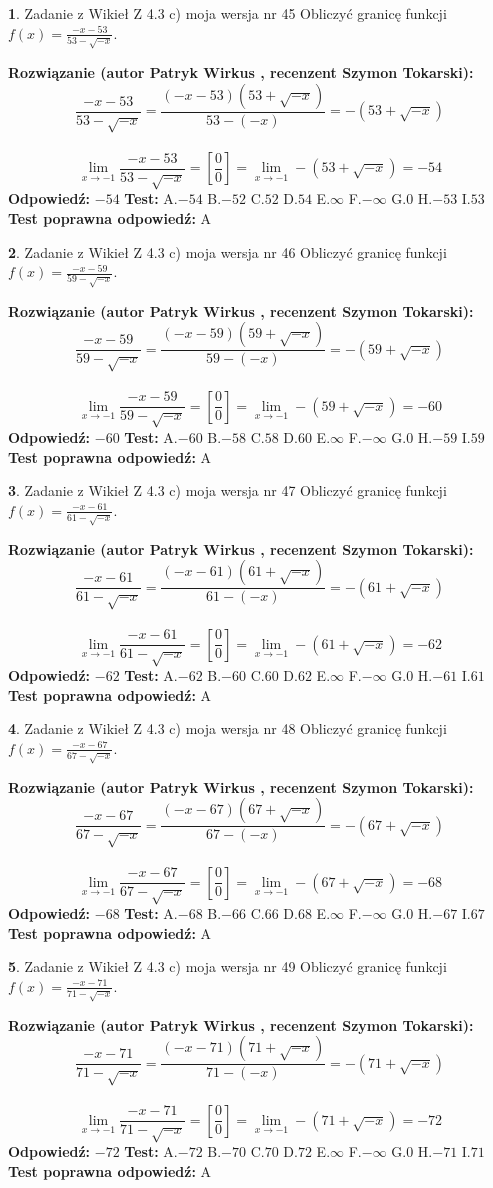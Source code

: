 \documentclass[12pt, a4paper]{article}
\theoremstyle{definition} %
\newtheorem{zad}{}
\newcommand{\zadStart}[1]{\begin{zad}#1\newline}
\newcommand{\zadStop}{\end{zad}}
\newcommand{\rozwStart}[2]{\noindent \textbf{Rozwiązanie (autor #1 , recenzent #2): }\newline}
\newcommand{\rozwStop}{\newline}
\newcommand{\odpStart}{\noindent \textbf{Odpowiedź:}\newline}
\newcommand{\odpStop}{\newline}
\newcommand{\testStart}{\noindent \textbf{Test:}\newline}
\newcommand{\testStop}{\newline}
\newcommand{\kluczStart}{\noindent \textbf{Test poprawna odpowiedź:}\newline}
\newcommand{\kluczStop}{\newline}
\begin{document}
\zadStart{Zadanie z Wikieł Z 4.3 c) moja wersja nr 45}
Obliczyć granicę funkcji $f(x)=\frac{-x-53}{53-\sqrt{-x}}$.
\zadStop
\rozwStart{Patryk Wirkus}{Szymon Tokarski}
$$\frac{-x-53}{53-\sqrt{-x}}=\frac{(-x-53)(53+\sqrt{-x})}{53-(-x)}=-(53+\sqrt{-x})$$
\\
$$\lim\limits_{x\to-1}\frac{-x-53}{53-\sqrt{-x}}=[\frac{0}{0}]=\lim\limits_{x\to-1}-(53+\sqrt{-x}) =-54$$
\rozwStop
\odpStart
$-54$
\odpStop
\testStart
A.$-54$
B.$-52$
C.$52$
D.$54$
E.$\infty$
F.$-\infty$
G.$0$
H.$-53$
I.$53$
\testStop
\kluczStart
A
\kluczStop



\zadStart{Zadanie z Wikieł Z 4.3 c) moja wersja nr 46}
Obliczyć granicę funkcji $f(x)=\frac{-x-59}{59-\sqrt{-x}}$.
\zadStop
\rozwStart{Patryk Wirkus}{Szymon Tokarski}
$$\frac{-x-59}{59-\sqrt{-x}}=\frac{(-x-59)(59+\sqrt{-x})}{59-(-x)}=-(59+\sqrt{-x})$$
\\
$$\lim\limits_{x\to-1}\frac{-x-59}{59-\sqrt{-x}}=[\frac{0}{0}]=\lim\limits_{x\to-1}-(59+\sqrt{-x}) =-60$$
\rozwStop
\odpStart
$-60$
\odpStop
\testStart
A.$-60$
B.$-58$
C.$58$
D.$60$
E.$\infty$
F.$-\infty$
G.$0$
H.$-59$
I.$59$
\testStop
\kluczStart
A
\kluczStop



\zadStart{Zadanie z Wikieł Z 4.3 c) moja wersja nr 47}
Obliczyć granicę funkcji $f(x)=\frac{-x-61}{61-\sqrt{-x}}$.
\zadStop
\rozwStart{Patryk Wirkus}{Szymon Tokarski}
$$\frac{-x-61}{61-\sqrt{-x}}=\frac{(-x-61)(61+\sqrt{-x})}{61-(-x)}=-(61+\sqrt{-x})$$
\\
$$\lim\limits_{x\to-1}\frac{-x-61}{61-\sqrt{-x}}=[\frac{0}{0}]=\lim\limits_{x\to-1}-(61+\sqrt{-x}) =-62$$
\rozwStop
\odpStart
$-62$
\odpStop
\testStart
A.$-62$
B.$-60$
C.$60$
D.$62$
E.$\infty$
F.$-\infty$
G.$0$
H.$-61$
I.$61$
\testStop
\kluczStart
A
\kluczStop



\zadStart{Zadanie z Wikieł Z 4.3 c) moja wersja nr 48}
Obliczyć granicę funkcji $f(x)=\frac{-x-67}{67-\sqrt{-x}}$.
\zadStop
\rozwStart{Patryk Wirkus}{Szymon Tokarski}
$$\frac{-x-67}{67-\sqrt{-x}}=\frac{(-x-67)(67+\sqrt{-x})}{67-(-x)}=-(67+\sqrt{-x})$$
\\
$$\lim\limits_{x\to-1}\frac{-x-67}{67-\sqrt{-x}}=[\frac{0}{0}]=\lim\limits_{x\to-1}-(67+\sqrt{-x}) =-68$$
\rozwStop
\odpStart
$-68$
\odpStop
\testStart
A.$-68$
B.$-66$
C.$66$
D.$68$
E.$\infty$
F.$-\infty$
G.$0$
H.$-67$
I.$67$
\testStop
\kluczStart
A
\kluczStop



\zadStart{Zadanie z Wikieł Z 4.3 c) moja wersja nr 49}
Obliczyć granicę funkcji $f(x)=\frac{-x-71}{71-\sqrt{-x}}$.
\zadStop
\rozwStart{Patryk Wirkus}{Szymon Tokarski}
$$\frac{-x-71}{71-\sqrt{-x}}=\frac{(-x-71)(71+\sqrt{-x})}{71-(-x)}=-(71+\sqrt{-x})$$
\\
$$\lim\limits_{x\to-1}\frac{-x-71}{71-\sqrt{-x}}=[\frac{0}{0}]=\lim\limits_{x\to-1}-(71+\sqrt{-x}) =-72$$
\rozwStop
\odpStart
$-72$
\odpStop
\testStart
A.$-72$
B.$-70$
C.$70$
D.$72$
E.$\infty$
F.$-\infty$
G.$0$
H.$-71$
I.$71$
\testStop
\kluczStart
A
\kluczStop
\end{document}
